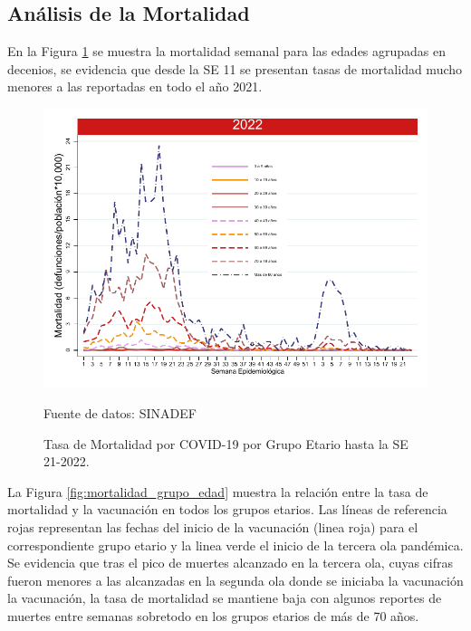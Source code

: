 \documentclass[12pt,a4paper,openany]{book}
\begin{document}
	\subsection*{Análisis de la Mortalidad}
	
	\noindent En la Figura \ref{fig:mortalidad_edad} se muestra la mortalidad semanal para las edades agrupadas en decenios, se evidencia que desde la SE 11 se presentan tasas de mortalidad mucho menores a las reportadas en todo el año 2021. 
	
	\begin{figure}[h]
		\caption{Tasa de Mortalidad por COVID-19 por Grupo Etario hasta la SE 21-2022.}\label{fig:mortalidad_edad}
		\begin{center}
			\includegraphics[width=0.65\linewidth]{../figuras/mortalidad_edad_2021_2022.pdf}
		\end{center}
		{\footnotesize Fuente de datos: SINADEF} 
	\end{figure}
	
	
	La Figura \ref{fig:mortalidad_grupo_edad} muestra la relación entre la tasa de mortalidad y la vacunación en todos los grupos etarios. Las líneas de referencia rojas representan las fechas del inicio de la vacunación (linea roja) para el correspondiente grupo etario y la linea verde el inicio de la tercera ola pandémica. Se evidencia que tras el pico de muertes alcanzado en la tercera ola, cuyas cifras fueron menores a las alcanzadas en la segunda ola donde se iniciaba la vacunación la vacunación, la tasa de mortalidad se mantiene baja con algunos reportes de muertes entre semanas sobretodo en los grupos etarios de más de 70 años. 
	
\end{document}
